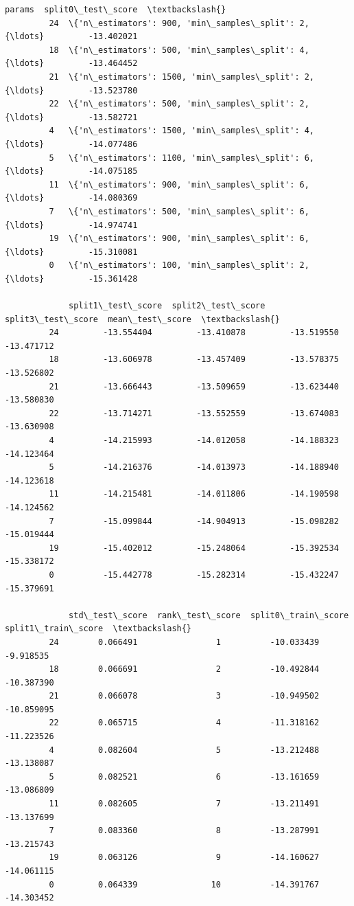 \documentclass[11pt]{article}
\begin{document}
\begin{Verbatim}[commandchars=\\\{\}]
                                                        params  split0\_test\_score  \textbackslash{}
         24  \{'n\_estimators': 900, 'min\_samples\_split': 2, {\ldots}         -13.402021   
         18  \{'n\_estimators': 500, 'min\_samples\_split': 4, {\ldots}         -13.464452   
         21  \{'n\_estimators': 1500, 'min\_samples\_split': 2,{\ldots}         -13.523780   
         22  \{'n\_estimators': 500, 'min\_samples\_split': 2, {\ldots}         -13.582721   
         4   \{'n\_estimators': 1500, 'min\_samples\_split': 4,{\ldots}         -14.077486   
         5   \{'n\_estimators': 1100, 'min\_samples\_split': 6,{\ldots}         -14.075185   
         11  \{'n\_estimators': 900, 'min\_samples\_split': 6, {\ldots}         -14.080369   
         7   \{'n\_estimators': 500, 'min\_samples\_split': 6, {\ldots}         -14.974741   
         19  \{'n\_estimators': 900, 'min\_samples\_split': 6, {\ldots}         -15.310081   
         0   \{'n\_estimators': 100, 'min\_samples\_split': 2, {\ldots}         -15.361428   
         
             split1\_test\_score  split2\_test\_score  split3\_test\_score  mean\_test\_score  \textbackslash{}
         24         -13.554404         -13.410878         -13.519550       -13.471712   
         18         -13.606978         -13.457409         -13.578375       -13.526802   
         21         -13.666443         -13.509659         -13.623440       -13.580830   
         22         -13.714271         -13.552559         -13.674083       -13.630908   
         4          -14.215993         -14.012058         -14.188323       -14.123464   
         5          -14.216376         -14.013973         -14.188940       -14.123618   
         11         -14.215481         -14.011806         -14.190598       -14.124562   
         7          -15.099844         -14.904913         -15.098282       -15.019444   
         19         -15.402012         -15.248064         -15.392534       -15.338172   
         0          -15.442778         -15.282314         -15.432247       -15.379691   
         
             std\_test\_score  rank\_test\_score  split0\_train\_score  split1\_train\_score  \textbackslash{}
         24        0.066491                1          -10.033439           -9.918535   
         18        0.066691                2          -10.492844          -10.387390   
         21        0.066078                3          -10.949502          -10.859095   
         22        0.065715                4          -11.318162          -11.223526   
         4         0.082604                5          -13.212488          -13.138087   
         5         0.082521                6          -13.161659          -13.086809   
         11        0.082605                7          -13.211491          -13.137699   
         7         0.083360                8          -13.287991          -13.215743   
         19        0.063126                9          -14.160627          -14.061115   
         0         0.064339               10          -14.391767          -14.303452   
         

\end{Verbatim}
\end{document}
